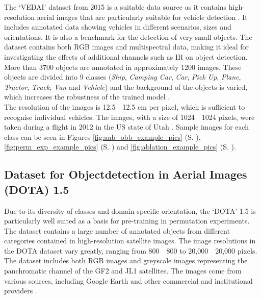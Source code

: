 The ‘\Acrfull{VEDAI}’ dataset \cite{vedai_web}  from 2015 is a suitable data source as it contains high-resolution aerial images that are particularly suitable for vehicle detection \cite{Razakarivony2015}. It includes annotated data showing vehicles in different scenarios, sizes and orientations. It is also a benchmark for the detection of very small objects. The dataset contains both \acrshort{RGB} images and multispectral data, making it ideal for investigating the effects of additional channels such as \acrshort{IR} on object detection. More than 3700 objects are annotated in approximately 1200 images. These objects are divided into 9 classes (\textit{Ship}, \textit{Camping Car}, \textit{Car}, \textit{Pick Up}, \textit{Plane}, \textit{Tractor}, \textit{Truck}, \textit{Van} and \textit{Vehicle}) and the background of the objects is varied, which increases the robustness of the trained model \cite{Razakarivony2015}. \\
The resolution of the images is 12.5~\texttimes~12.5 cm per pixel, which is sufficient to recognise individual vehicles. The images, with a size of 1024~\texttimes~1024 pixels, were taken during a flight in 2012 in the US state of Utah \cite{Razakarivony2015}. Sample images for each class can be seen in Figures \ref{fig:aab_obb_example_pics} (S. \pageref{fig:aab_obb_example_pics}), \ref{fig:perm_exp_example_pics} (S. \pageref{fig:perm_exp_example_pics}) and \ref{fig:ablation_example_pics} (S. \pageref{fig:ablation_example_pics}).



\subsection{Dataset for Objectdetection in Aerial Images (DOTA) 1.5}
\label{subsec:DOTA}
Due to its diversity of classes and domain-specific orientation, the ‘\Acrfull{DOTA}’ 1.5 \cite{DOTA_Web} is particularly well suited as a basis for pre-training in permutation experiments. The dataset contains a large number of annotated objects from different categories contained in high-resolution satellite images. The image resolutions in the \acrshort{DOTA} dataset vary greatly, ranging from 800~\texttimes~800 to 20,000~\texttimes~20,000 pixels. The dataset includes both \acrshort{RGB} images and greyscale images representing the panchromatic channel of the GF2 and JL1 satellites. The images come from various sources, including Google Earth and other commercial and institutional providers \cite{DOTA1,DOTA2,DOTA3}.


